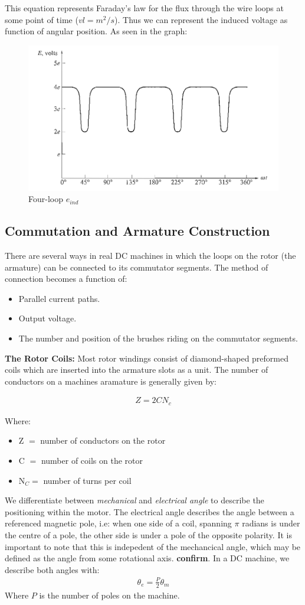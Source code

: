 \documentclass{book}
\begin{document}
This equation represents Faraday's law for the flux through the wire loops at some point of time ($v l = m^2 /s$). Thus we can represent the induced voltage as function of angular position. As seen in the graph: 
\begin{figure}[h]
	\centering
	\includegraphics[width=0.4\linewidth]{Screenshots/four_loop_DC_voltage_theta}
	\caption{Four-loop $e_{ind}$}
	\label{fig:fourloopdcvoltagetheta}
\end{figure}

\subsection{Commutation and Armature Construction}

There are several ways in real DC machines in which the loops on the rotor (the armature) can be connected to its commutator segments. The method of connection becomes a function of:
\begin{itemize}
	\item Parallel current paths.
	\item Output voltage.
	\item The number and position of the brushes riding on the commutator segments. 
\end{itemize}

\textbf{The Rotor Coils:} Most rotor windings consist of diamond-shaped preformed coils which are inserted into the armature slots as a unit. The number of conductors on a machines aramature is generally given by:

\begin{align*}
	Z = 2CN_c
\end{align*}

Where: 
\begin{itemize}
	\item Z $=$ number of conductors on the rotor
	\item C $=$ number of coils on the rotor
	\item N$_C =$ number of turns per coil
\end{itemize}

We differentiate between \textit{mechanical} and \textit{electrical angle} to describe the positioning within the motor. The electrical angle describes the angle between a referenced magnetic pole, i.e: when one side of a coil, spanning $\pi$ radians is under the centre of a pole, the other side is under a pole of the opposite polarity. It is important to note that this is indepedent of the mechancical angle, which may be defined as the angle from some rotational axis. \textbf{confirm}. In a DC machine, we describe both angles with:
\begin{align*}
	\theta _e = \frac{P}{2}\theta_m
\end{align*}
Where $P$ is the number of poles on the machine.
\end{document}
